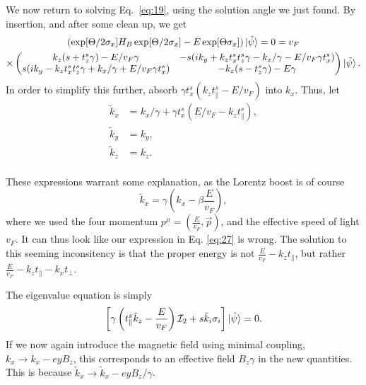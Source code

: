 We now return to solving Eq.~\eqref{eq:19}, using the solution angle we just found.
By insertion, and after some clean up, we get
\begin{multline}
  \label{eq:26}
  (\exp[\Theta /2 \sigma_{x}] H_{B}\exp[\Theta /2 \sigma_{x}] - E \exp[\Theta \sigma_{x}]) \ket{\tilde{\psi}} = 0
  = v_F \\
  \times \begin{pmatrix}
          k_z ( s + t^s_z \gamma ) - E / v_F \gamma & -s ( ik_y + k_z t^s_x t^s_z \gamma - k_x / \gamma - E /v_{F} \gamma t^s_x)\\
          s ( i k_y - k_z t^s_x t^s_z \gamma + k_x / \gamma + E /v_F \gamma t^s_x) & - k_z (s - t^s_z \gamma) - E \gamma
        \end{pmatrix}
    \ket{\tilde{\psi}}.
\end{multline}
In order to simplify this further, absorb \(\gamma t^s_x (k_{z} t^s_{\parallel} - E /v_{F}) \) into \(k_{x}\).
Thus, let
\begin{equation}
  \label{eq:27}
  \begin{split}
    \tilde{k}_{x} &= k_{x} / \gamma + \gamma t^s_x ( E /v_F - k_{z} t^s_{\parallel}),\\
    \tilde{k}_{y} &=  k_{y},\\
    \tilde{k}_{z} &=  k_{z}.\\
  \end{split}
\end{equation}

These expressions warrant some explanation, as the Lorentz boost is of course
\begin{equation}
  \label{eq:28}
  \tilde{k}_x = \gamma (k_x - \beta \frac{E}{v_{F}}),
\end{equation}
where we used the four momentum \( p^{\mu } = (\frac{E}{v_{F}}, \vec{p}) \), and the effective speed of light \( v_F \).
It can thus look like our expression in Eq. \eqref{eq:27} is wrong.
The solution to this seeming inconsitency is that the proper energy is not \( \frac{E}{v_{F}} - k_z t_{\parallel} \), but rather \( \frac{E}{v_{F}} - k_z t_{\parallel} - k_x t_{\perp}\).

The eigenvalue equation is simply
\begin{equation}
  \label{eq:29}
  \left[  \gamma \left( t^s_{\parallel} \tilde{k}_{z} - \frac{E}{v_{F}} \right) \mathcal{I}_{2} +
  s \tilde{k}_{i} \sigma _{i} \right] \ket{\tilde{\psi}}= 0.
\end{equation}
If we now again introduce the magnetic field using minimal coupling, \(k_{x} \to  k_{x} - ey B_{z} \), this corresponds to an effective field \(B_{z} \gamma \) in the new quantities.
This is because \(\tilde{k}_{x} \to  \tilde{k}_{x} - e y B_{z} /\gamma \).

